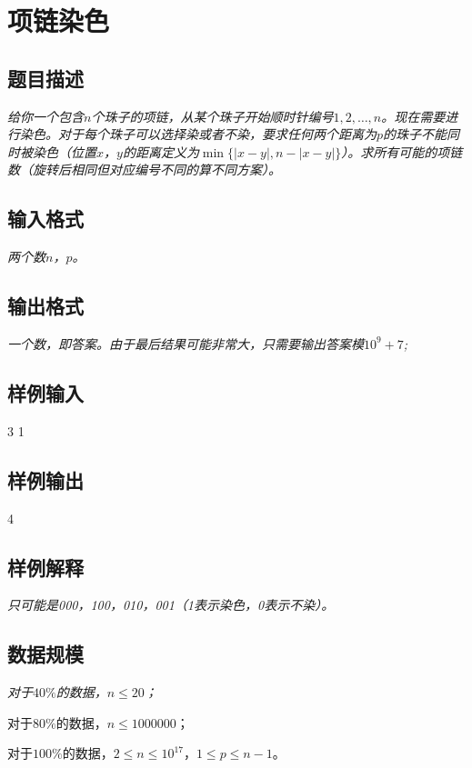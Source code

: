 \section{项链染色}
\subsection{题目描述}
{\itshape
	给你一个包含$n$个珠子的项链，从某个珠子开始顺时针编号$1,2, \ldots, n$。现在需要进行染色。对于每个珠子可以选择染或者不染，要求任何两个距离为$p$的珠子不能同时被染色（位置$x$，$y$的距离定义为$\min \{|x - y|, n - |x - y|\}$）。求所有可能的项链数（旋转后相同但对应编号不同的算不同方案）。
}
\subsection{输入格式}
{\itshape
两个数$n$，$p$。
}
\subsection{输出格式}
{\itshape
一个数，即答案。由于最后结果可能非常大，只需要输出答案模$10^9+7$;
}
\subsection{样例输入}
3 1
\subsection{样例输出}
4
\subsection{样例解释}
{\itshape
只可能是000，100，010，001（1表示染色，0表示不染）。
}
\subsection{数据规模}
{\itshape
对于$40\%$的数据，$n \le 20$； \par
对于$80\%$的数据，$n \le 1000000$； \par
对于$100\%$的数据，$2 \le n \le 10^{17}$，$1 \le p \le n - 1$。
}
